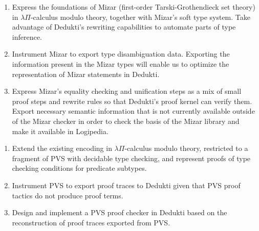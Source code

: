 \begin{workpackage}[id=theories,wphases=0-48,type=RTD,
  short=Theories,%
  title= Theories,
  lead=Inn,
  InnRM=6,
  BiaRM=48,
  LmuRM=12,
  SacRM=36,
  InrRM=24,
  ]
\begin{tasklist}
\begin{task}[id=mizar,
  title=Express the theory of Mizar in Dedukti,
  lead=Bia,   %
  BiaRM=0, %
  InnRM=0 %
  ]
  \begin{enumerate}
  \item Express the foundations of Mizar (first-order Tarski-Grothendieck set
    theory) in $\lambda\Pi$-calculus modulo theory, together with Mizar's soft
    type system. Take advantage of Dedukti's rewriting capabilities to automate
    parts of type inference.
  \item Instrument Mizar to export type disambiguation data. Exporting the
    information present in the Mizar types will enable us to optimize the
    representation of Mizar statements in Dedukti.
  \item Express Mizar's equality checking and unification steps as a mix of
    small proof steps and rewrite rules so that Dedukti's proof kernel can
    verify them. Export necessary semantic information that is not currently
    available outside of the Mizar checker in order to check the basis of the
    Mizar library and make it available in Logipedia.
  \end{enumerate}
\end{task}

\begin{task}[id=pvs,
  title=Express the theory of PVS in Dedukti,
  lead=Inr,   %
  InrRM=0  %
  ]
  \begin{enumerate}
  \item Extend the existing encoding in $\lambda\Pi$-calculus modulo theory,
    restricted to a fragment of PVS with decidable type checking, and represent
    proofs of type checking conditions for predicate subtypes.
  \item Instrument PVS to export proof traces to Dedukti given that PVS proof
    tactics do not produce proof terms.
  \item Design and implement a PVS proof checker in Dedukti based on the
    reconstruction of proof traces exported from PVS.
  \end{enumerate}
\end{task}


\end{tasklist}
\end{workpackage}

